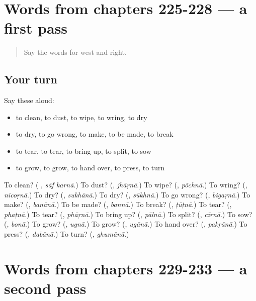 \section[(dialogue)]{Words from chapters 225-228 — a first pass}

\label{lesson:HI-R233-first-pass-words-from-chapters-225-228}



\begin{quote}
Say the words for west and right.
\end{quote}

\subsection*{Your turn}
Say these aloud:

\begin{itemize}
\raggedright
  \item to clean, to dust, to wipe, to wring, to dry
  \item to dry, to go wrong, to make, to be made, to break
  \item to tear, to tear, to bring up, to split, to sow
  \item to grow, to grow, to hand over, to press, to turn
\end{itemize}

\begin{tcolorbox}[breakable,colback=teal!4,colframe=teal!35!black,title={Before you move on}]
To clean? (\textbf{ }, \emph{sāf karnā}.) To dust? (\textbf{}, \emph{jhāṛnā}.) To wipe? (\textbf{}, \emph{põchnā}.) To wring? (\textbf{}, \emph{nicoṛnā}.) To dry? (\textbf{}, \emph{sukhānā}.) To dry? (\textbf{}, \emph{sūkhnā}.) To go wrong? (\textbf{}, \emph{bigaṛnā}.) To make? (\textbf{}, \emph{banānā}.) To be made? (\textbf{}, \emph{bannā}.) To break? (\textbf{}, \emph{ṭūṭnā}.) To tear? (\textbf{}, \emph{phaṭnā}.) To tear? (\textbf{}, \emph{phāṛnā}.) To bring up? (\textbf{}, \emph{pālnā}.) To split? (\textbf{}, \emph{cīrnā}.) To sow? (\textbf{}, \emph{bonā}.) To grow? (\textbf{}, \emph{ugnā}.) To grow? (\textbf{}, \emph{ugānā}.) To hand over? (\textbf{}, \emph{pakṛānā}.) To press? (\textbf{}, \emph{dabānā}.) To turn? (\textbf{}, \emph{ghumānā}.)
\end{tcolorbox}
\section[(dialogue)]{Words from chapters 229-233 — a second pass}

